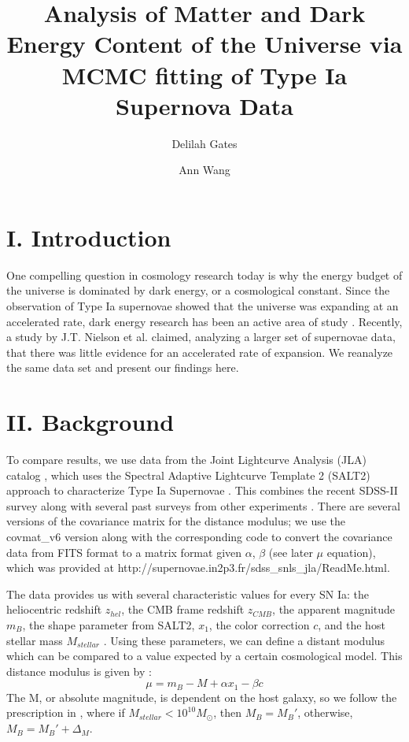 \documentclass[aps,prl,reprint]{revtex4-1}
\begin{document}

\title{	Analysis of Matter and Dark Energy Content of the Universe via MCMC fitting of Type Ia Supernova Data}
\author{Delilah Gates}
\author{Ann Wang}
\begin{abstract}
\end{abstract}
\maketitle
\section{I. Introduction}
One compelling question in cosmology research today is why the energy budget of the universe is dominated by dark energy, or a cosmological constant. Since the observation of Type Ia supernovae showed that the universe was expanding at an accelerated rate, dark energy research has been an active area of study \cite{riess_sn}. Recently, a study by J.T. Nielson et al. \cite{shocker} claimed, analyzing a larger set of supernovae data, that there was little evidence for an accelerated rate of expansion. We reanalyze the same data set and present our findings here.
\section{II. Background}
To compare results, we use data from the Joint Lightcurve Analysis (JLA) catalog \cite{sdss}, which uses the Spectral Adaptive Lightcurve Template 2 (SALT2) approach to characterize Type Ia Supernovae \cite{salt2}. This combines the recent SDSS-II survey along with several past surveys from other experiments \cite{sdss}. There are several versions of the covariance matrix for the distance modulus; we use the covmat\_v6 version along with the corresponding code to convert the covariance data from FITS format \cite{fits} to a matrix format given $\alpha$, $\beta$ (see later $\mu$ equation), which was provided at http://supernovae.in2p3.fr/sdss\_snls\_jla/ReadMe.html. 
\par The data provides us with several characteristic values for every SN Ia: the heliocentric redshift $z_{hel}$, the CMB frame redshift $z_{CMB}$, the apparent magnitude $m_B$, the shape parameter from SALT2, $x_1$, the color correction $c$, and the host stellar mass $M_{stellar}$ \cite{sdss}. Using these parameters, we can define a distant modulus which can be compared to a value expected by a certain cosmological model. This distance modulus is given by \cite{sdss}: 
\begin{equation}
\mu = m_B - M + \alpha x_1 - \beta c
\end{equation}
The M, or absolute magnitude, is dependent on the host galaxy, so we follow the prescription in \cite{sdss}, where if $M_{stellar} < 10^{10} M_{\odot}$, then $M_B = M_B'$, otherwise, $M_B = M_B' + \Delta_M$. 
\end{document}
